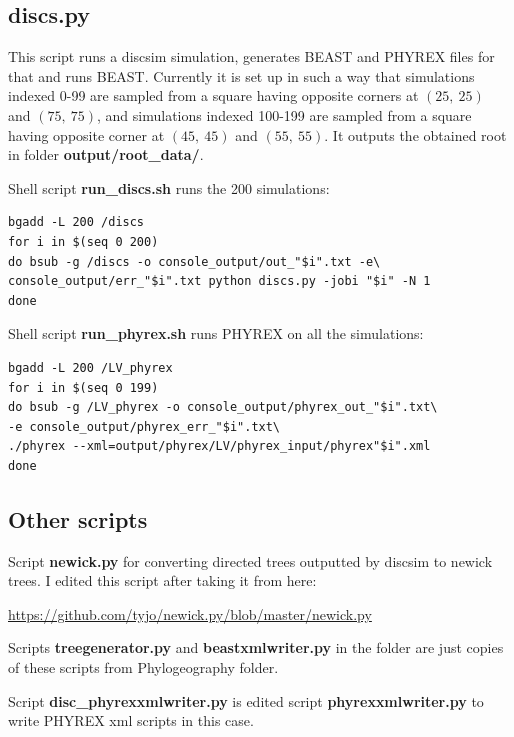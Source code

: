 \subsection*{discs.py}

This script runs a discsim simulation, generates BEAST and PHYREX files for that and runs BEAST.
Currently it is set up in such a way that simulations indexed 0-99 are sampled from a square having opposite corners at $(25,\ 25)$ and $(75,\ 75)$, and simulations indexed 100-199 are sampled from a square having opposite corner at $(45,\ 45)$ and $(55,\ 55)$. It outputs the obtained root in folder \textbf{output/root\_data/}.



Shell script \textbf{run\_discs.sh} runs the 200 simulations:

\begin{verbatim}
bgadd -L 200 /discs
for i in $(seq 0 200)
do bsub -g /discs -o console_output/out_"$i".txt -e\
console_output/err_"$i".txt python discs.py -jobi "$i" -N 1
done
\end{verbatim}

Shell script \textbf{run\_phyrex.sh} runs PHYREX on all the simulations:

\begin{verbatim}
bgadd -L 200 /LV_phyrex
for i in $(seq 0 199)
do bsub -g /LV_phyrex -o console_output/phyrex_out_"$i".txt\
-e console_output/phyrex_err_"$i".txt\
./phyrex --xml=output/phyrex/LV/phyrex_input/phyrex"$i".xml
done  
\end{verbatim}



\subsection*{Other scripts}

Script \textbf{newick.py} for converting directed trees outputted by discsim to newick trees.
I edited this script after taking it from here:

\url{https://github.com/tyjo/newick.py/blob/master/newick.py}

Scripts \textbf{treegenerator.py} and \textbf{beastxmlwriter.py} in the folder are just copies of these scripts from Phylogeography folder.

Script \textbf{disc\_phyrexxmlwriter.py} is edited script \textbf{phyrexxmlwriter.py} to write  PHYREX xml scripts in this case.


